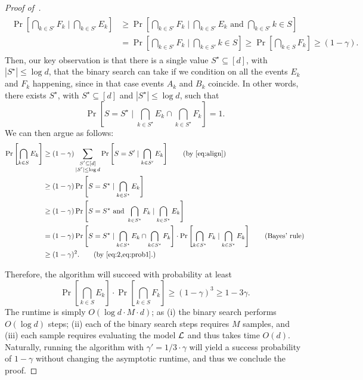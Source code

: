 \begin{proof}[Proof of~]
\begin{align}
	\begin{split}
	\Pr\left[\bigcap_{k \in S'} F_k \mid \bigcap_{k \in S'} E_k\right] &    \geq  \Pr\left[\bigcap_{k \in S'} F_k \mid \bigcap_{k \in S'} E_k \text{ and  } \bigcap_{k \in S'} {k \in S}\right] \\
	&= \Pr\left[\bigcap_{k \in S'} F_k \mid \bigcap_{k \in S'} {k \in S}\right] \geq \Pr\left[\bigcap_{k \in S} F_k\right] \geq (1-\gamma).
	\end{split}
\end{align}
Then, our key observation is that there is a single value $S^\star \subseteq [d]$, with $|S^\star| \leq \log d$, that the binary search can take if we condition on all the events $E_k$ and $F_k$ happening, since in that case events $A_k$ and $B_k$ coincide. In other words, there exists $S^\star$, with $S^\star \subseteq [d]$ and $|S^\star| \leq \log d$, such that
\begin{equation}\label{eq:prob1}
\Pr\left[S = S^\star \mid \bigcap_{k \in S^\star} E_k \cap \bigcap_{k \in S^\star} F_k\right] = 1.
\end{equation}
We can then argue as follows:
\begin{align*}
	\Pr\left[\bigcap_{k \in S} E_k\right] &\geq (1-\gamma) \sum_{\substack{S' \subseteq [d]\\ |S'| \leq \log d}} \Pr\left[S = S' \mid \bigcap_{k \in S'} E_k\right]\tag{by~\Cref{eq:align}}\\
	&\geq (1-\gamma) \Pr\left[S = S^\star  \mid \bigcap_{k \in S^\star} E_k \right]\\
	&\geq (1-\gamma) \Pr\left[S = S^\star \text{ and } \bigcap_{k \in S^\star} F_k \mid \bigcap_{k \in S^\star} E_k \right]\\
	&= (1-\gamma) \Pr\left[S = S^\star \mid \bigcap_{k \in S^\star} E_k \cap \bigcap_{k \in S^\star} F_k\right] \cdot \Pr\left[\bigcap_{k \in S^\star} F_k \mid \bigcap_{k \in S^\star} E_k\right]\tag{Bayes' rule}\\
	&\geq (1-\gamma)^2. \tag{by~\Cref{eq:2,eq:prob1}.}
\end{align*}


Therefore, the algorithm will succeed with probability at least 
\[ 
	\Pr\left[\bigcap_{k \in S} E_k\right] \cdot \Pr\left[\bigcap_{k \in S} F_k\right] \geq (1-\gamma)^3 \geq 1-3\gamma.
\]
The runtime is simply
$O(\log d \cdot M \cdot d  )$; as (i) the binary search performs $O(\log d)$ steps; (ii) each of the binary search steps requires $M$ samples, and (iii) each sample requires evaluating the model $\mathcal{L}$ and thus takes time $O(d)$. Naturally, running the algorithm with $\gamma' = 1/3 \cdot \gamma$ will yield a success probability of $1-\gamma$ without changing the asymptotic runtime, and thus we conclude the proof.



\end{proof}
